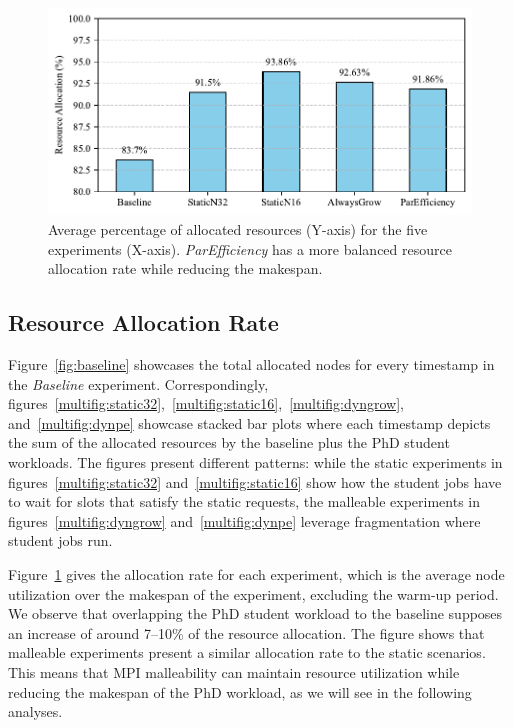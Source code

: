 \documentclass[a4paper,fleqn]{cas-dc}
\begin{document}
\begin{figure}[tbp]
    \centering
    \includegraphics[clip,width=0.75\linewidth,trim={0.1cm 0.1cm 0.1cm 0.1cm}]{figures/resourceAlloc.pdf}
            \caption{Average percentage of allocated resources (Y-axis) for the five experiments (X-axis). \textit{ParEfficiency} has a more balanced resource allocation rate while reducing the makespan.}
    \label{fig:resource_allocation}
\end{figure}

\subsection{Resource Allocation Rate}\label{subsec:utilization}

Figure~\ref{fig:baseline} showcases the total allocated nodes for every timestamp in the \textit{Baseline} experiment.
Correspondingly, figures~\ref{multifig:static32},~\ref{multifig:static16},~\ref{multifig:dyngrow}, and~\ref{multifig:dynpe} showcase stacked bar plots where each timestamp depicts the sum of the allocated resources by the baseline plus the PhD student workloads.
The figures present different patterns: while the static experiments 
in figures~\ref{multifig:static32} and~\ref{multifig:static16} show how the student jobs have to wait for slots that satisfy the static requests, the malleable experiments in figures~\ref{multifig:dyngrow} and~\ref{multifig:dynpe} leverage fragmentation where student jobs run.

Figure~\ref{fig:resource_allocation} gives the allocation rate for each experiment, which is the average node utilization over the makespan of the experiment, excluding the warm-up period.
We observe that overlapping the PhD student workload to the baseline supposes an increase of around 7--10\% of the resource allocation.
The figure shows that malleable experiments present a similar allocation rate to the static scenarios.
This means that MPI malleability can maintain resource utilization while reducing the makespan of the PhD workload, as we will see in the following analyses.
\end{document}

